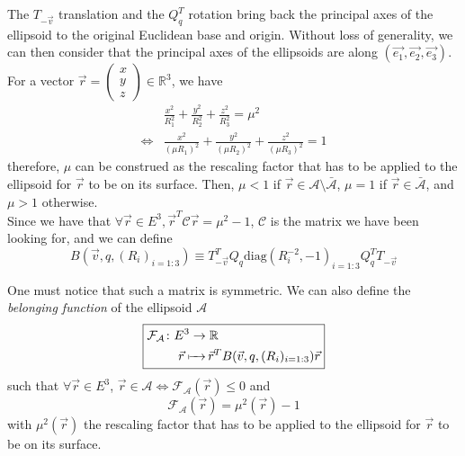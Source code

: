 \documentclass[class=report, float=false, crop=false]{standalone}
\begin{document}
The $T_{-\vec{v}}$ translation and the $Q_q^T$ rotation bring back the principal axes of the ellipsoid to the original Euclidean base and origin. Without loss of generality, we can then consider that the principal axes of the ellipsoids are along $(\vec{e_1},\vec{e_2},\vec{e_3})$.\\

For a vector \(\vec{r} = \begin{pmatrix} x \\ y \\ z \end{pmatrix} \in \mathbb{R}^3\), we have
\begin{align*}
&\frac{x^2}{R_1^2} + \frac{y^2}{R_2^2} + \frac{z^2}{R_3^2} = \mu^2\\
\Leftrightarrow & \frac{x^2}{(\mu R_1)^2} + \frac{y^2}{(\mu R_2)^2} + \frac{z^2}{(\mu R_3)^2} = 1
\end{align*}
therefore, $\mu$ can be construed as the rescaling factor that has to be applied to the ellipsoid for $\vec{r}$ to be on its surface. Then, $\mu < 1$ if $\vec{r} \in \mathcal{A}\setminus\bar{\mathcal{A}}$, $\mu = 1$ if $\vec{r} \in \bar{\mathcal{A}}$, and $\mu > 1$ otherwise.\\

Since we have that $\forall \vec{r} \in E^3, \vec{r}^T\mathcal{C}\vec{r} = \mu^2 - 1$, $\mathcal{C}$ is the matrix we have been looking for, and we can define
\begin{equation}
\boxed{B(\vec{v},q,(R_i)_{i=1:3}) \equiv T_{-\vec{v}}^TQ_q\text{diag}(R_i^{-2},-1)_{i=1:3}Q_q^TT_{-\vec{v}}}
\label{belonging_matrix}
\end{equation}

One must notice that such a matrix is symmetric. We can also define the \textit{belonging function} of the ellipsoid $\mathcal{A}$
\begin{equation}
\boxed{\begin{aligned}\mathcal{F}_{\mathcal{A}} \colon &E^3 \to \mathbb{R}\\     &\phantomarrow{E^3}{\vec{r}} \vec{r}^TB(\vec{v},q,(R_i)_{i=1:3})\vec{r}\end{aligned}}
\label{belonging_function}
\end{equation}
such that $\forall \vec{r} \in E^3$, $\vec{r} \in \mathcal{A} \Leftrightarrow \mathcal{F}_{\mathcal{A}}(\vec{r}) \leq 0$ and
\begin{equation}
\boxed{\mathcal{F}_{\mathcal{A}}(\vec{r}) = \mu^2(\vec{r}) - 1}
\end{equation}
with $\mu^2(\vec{r})$ the rescaling factor that has to be applied to the ellipsoid for $\vec{r}$ to be on its surface.
\end{document}
